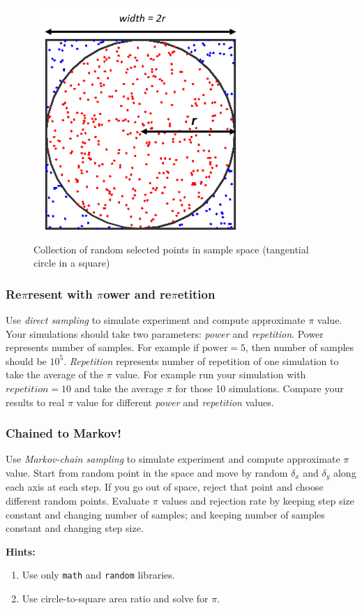 \documentclass[a4paper]{article}
\begin{document}
\begin{figure}[ht]
    \centering
    \includegraphics[scale=0.5]{monte_pi.png}
    \caption{Collection of random selected points in sample space (tangential circle in a square)}
    \label{fig:monte carlo}
\end{figure}

\subsubsection{Re$\pi$resent with $\pi$ower and re$\pi$etition}
Use \textit{direct sampling} to simulate experiment and compute approximate $ \pi $ value. Your simulations should take two parameters: \textit{power} and \textit{repetition}. Power represents number of samples. For example if $ \text{power}=5 $, then number of samples should be $ 10^5 $. \textit{Repetition} represents number of repetition of one simulation to take the average of the $ \pi $ value. For example run your simulation with $ repetition=10 $ and take the average $ \pi $ for those 10 simulations. Compare your results to real $ \pi $ value for different \textit{power} and \textit{repetition} values.

\subsubsection{Chained to Markov!}
Use \textit{Markov-chain sampling} to simulate experiment and compute approximate $ \pi $ value. Start from random point in the space and move by random $ \delta_x $ and $ \delta_y $ along each axis at each step. If you go out of space, reject that point and choose different random points. Evaluate $ \pi $ values and rejection rate by keeping step size constant and changing number of samples; and keeping number of samples constant and changing step size.

\textbf{Hints:}
\begin{enumerate}
    \item Use only \verb|math| and \verb|random| libraries.
    \item Use circle-to-square area ratio and solve for $ \pi $.
\end{enumerate}



\end{document}
